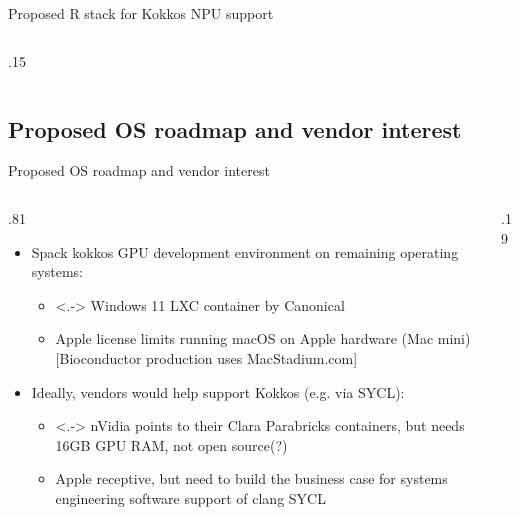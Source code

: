 \documentclass[
aspectratio=169,
xcolor={usenames}
]{beamer}
\begin{document}
\begin{frame}{Proposed R stack for Kokkos NPU support}
\begin{columns}[T]
\begin{column}{.15\framewidth}
    \end{column}
  \end{columns}
\end{frame}

\subsection{Proposed OS roadmap  and vendor interest}
\begin{frame}{Proposed OS roadmap and vendor interest}
  \begin{columns}[T]
    \begin{column}{.81\framewidth}
      \begin{itemize}[<+->]
      \item Spack kokkos GPU development environment %
        on remaining operating systems:
        \begin{itemize}
        \item<.-> Windows 11 LXC container by Canonical
        \item Apple license %
          limits running macOS on Apple hardware (Mac mini) %
          [Bioconductor production uses MacStadium.com]\footnotemark[2]
        \end{itemize}
      \item Ideally, vendors would help support Kokkos (e.g. via SYCL):
        \begin{itemize}
        \item<.-> nVidia points to their Clara Parabricks containers, %
          but needs 16GB GPU RAM, not open source(?)
        \item Apple receptive, %
          but need to build the business case %
          for systems engineering software support of clang SYCL
        \end{itemize}
      \end{itemize}
    \end{column}
    \begin{column}{.19\framewidth}
      \begin{tikzpicture}

\end{tikzpicture}
\end{column}
\end{columns}
\end{frame}
\end{document}
